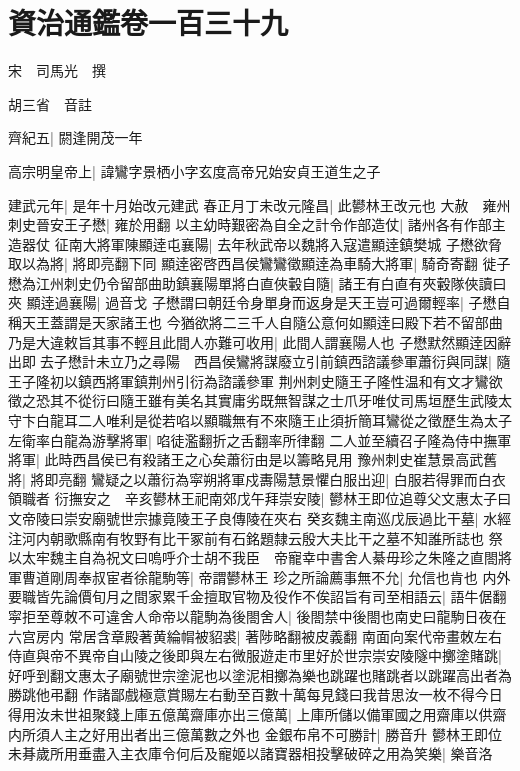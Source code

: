 \chapter{資治通鑑卷一百三十九}
宋　司馬光　撰

胡三省　音註

齊紀五|{
	閼逢開茂一年}


高宗明皇帝上|{
	諱鸞字景栖小字玄度高帝兄始安貞王道生之子}


建武元年|{
	是年十月始改元建武}
春正月丁未改元隆昌|{
	此鬰林王改元也}
大赦　雍州刺史晉安王子懋|{
	雍於用翻}
以主幼時艱密為自全之計令作部造仗|{
	諸州各有作部主造器仗}
征南大將軍陳顯逹屯襄陽|{
	去年秋武帝以魏將入寇遣顯逹鎮樊城}
子懋欲脅取以為將|{
	將即亮翻下同}
顯逹密啓西昌侯鸞鸞徵顯逹為車騎大將軍|{
	騎奇寄翻}
徙子懋為江州刺史仍令留部曲助鎮襄陽單將白直俠轂自隨|{
	諸王有白直有夾轂隊俠讀曰夾}
顯逹過襄陽|{
	過音戈}
子懋謂曰朝廷令身單身而返身是天王豈可過爾輕率|{
	子懋自稱天王蓋謂是天家諸王也}
今猶欲將二三千人自隨公意何如顯逹曰殿下若不留部曲乃是大違敕旨其事不輕且此間人亦難可收用|{
	此間人謂襄陽人也}
子懋默然顯逹因辭出即去子懋計未立乃之尋陽　西昌侯鸞將謀廢立引前鎮西諮議參軍蕭衍與同謀|{
	隨王子隆初以鎮西將軍鎮荆州引衍為諮議參軍}
荆州刺史隨王子隆性温和有文才鸞欲徵之恐其不從衍曰隨王雖有美名其實庸劣既無智謀之士爪牙唯仗司馬垣歷生武陵太守卞白龍耳二人唯利是從若啗以顯職無有不來隨王止須折簡耳鸞從之徵歷生為太子左衛率白龍為游擊將軍|{
	啗徒濫翻折之舌翻率所律翻}
二人並至續召子隆為侍中撫軍將軍|{
	此時西昌侯已有殺諸王之心矣蕭衍由是以籌略見用}
豫州刺史崔慧景高武舊將|{
	將即亮翻}
鸞疑之以蕭衍為寜朔將軍戍夀陽慧景懼白服出迎|{
	白服若得罪而白衣領職者}
衍撫安之　辛亥鬰林王祀南郊戊午拜崇安陵|{
	鬰林王即位追尊父文惠太子曰文帝陵曰崇安廟號世宗據竟陵王子良傳陵在夾右}
癸亥魏主南巡戊辰過比干墓|{
	水經注河内朝歌縣南有牧野有比干冢前有石銘題隸云殷大夫比干之墓不知誰所誌也}
祭以太牢魏主自為祝文曰嗚呼介士胡不我臣　帝寵幸中書舍人綦毋珍之朱隆之直閤將軍曹道剛周奉叔宦者徐龍駒等|{
	帝謂鬰林王}
珍之所論薦事無不允|{
	允信也肯也}
内外要職皆先論價旬月之間家累千金擅取官物及役作不俟詔旨有司至相語云|{
	語牛倨翻}
寜拒至尊敇不可違舍人命帝以龍駒為後閤舍人|{
	後閤禁中後閤也南史曰龍駒日夜在六宫房内}
常居含章殿著黄綸㡌被貂裘|{
	著陟略翻被皮義翻}
南面向案代帝畫敇左右侍直與帝不異帝自山陵之後即與左右微服遊走市里好於世宗崇安陵隧中擲塗賭跳|{
	好呼到翻文惠太子廟號世宗塗泥也以塗泥相擲為樂也跳躍也賭跳者以跳躍高出者為勝跳他弔翻}
作諸鄙戲極意賞賜左右動至百數十萬每見錢曰我昔思汝一枚不得今日得用汝未世祖聚錢上庫五億萬齋庫亦出三億萬|{
	上庫所儲以備軍國之用齋庫以供齋内所須人主之好用出者出三億萬數之外也}
金銀布帛不可勝計|{
	勝音升}
鬰林王即位未朞歲所用垂盡入主衣庫令何后及寵姬以諸寶器相投擊破碎之用為笑樂|{
	樂音洛}
